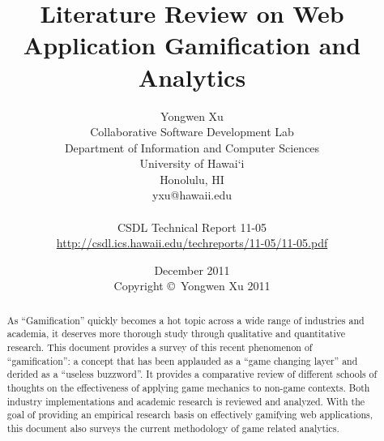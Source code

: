 \documentclass[11pt]{report}
\begin{document}
\title{Literature Review on Web Application Gamification and Analytics}
\author{Yongwen Xu \\
Collaborative Software Development Lab \\
Department of Information and Computer Sciences \\
University of Hawai`i \\
Honolulu, HI \\
yxu@hawaii.edu \\
\\
CSDL Technical Report 11-05 \\
\url{http://csdl.ics.hawaii.edu/techreports/11-05/11-05.pdf}
}
\date{December 2011\\[3pt]
Copyright \copyright\ Yongwen Xu 2011}

\maketitle

\tableofcontents

\begin{abstract}
As ``Gamification'' quickly becomes a hot topic across a wide range of industries and academia, it deserves more thorough study through qualitative and quantitative research. This document provides a survey of this recent phenomenon of ``gamification'': a concept that has been applauded as a ``game changing layer'' and derided as a ``useless buzzword''. It provides a comparative review of different schools of thoughts on the effectiveness of applying game mechanics to non-game contexts. Both industry implementations and academic research is reviewed and analyzed. With the goal of providing an empirical research basis on effectively gamifying web applications, this document also surveys the current methodology of game related analytics.
\end{abstract}












%
%
%


\end{document}
